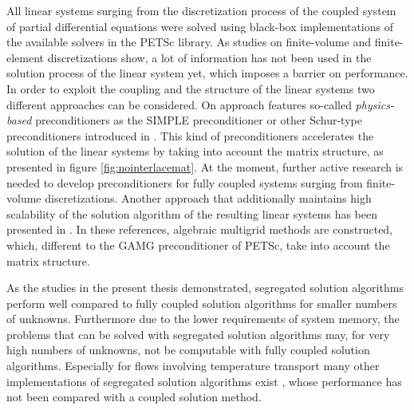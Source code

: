 All linear systems surging from the discretization process of the coupled system of partial differential equations were solved using black-box implementations of the available solvers in the PETSc library. As studies on finite-volume \cite{klaij13,darwish09,mangani14} and finite-element \cite{brown12,elman03,elman08,silvester01,turek02,mcinnes14} discretizations show, a lot of information has not been used in the solution process of the linear system yet, which imposes a barrier on performance. In order to exploit the coupling and the structure of the linear systems two different approaches can be considered. On approach features so-called \emph{physics-based} preconditioners as the SIMPLE preconditioner or other Schur-type preconditioners introduced in \cite{klaij13,elman08}. This kind of preconditioners accelerates the solution of the linear systems by taking into account the matrix structure, as presented in figure \ref{fig:nointerlacemat}. At the moment, further active research is needed to develop preconditioners for fully coupled systems surging from finite-volume discretizations. Another approach that additionally maintains high scalability of the solution algorithm of the resulting linear systems has been presented in \cite{darwish09,mangani14}. In these references, algebraic multigrid methods are constructed, which, different to the GAMG preconditioner of PETSc, take into account the matrix structure.

As the studies in the present thesis demonstrated, segregated solution algorithms perform well compared to fully coupled solution algorithms for smaller numbers of unknowns. Furthermore due to the lower requirements of system memory, the problems that can be solved with segregated solution algorithms may, for very high numbers of unknowns, not be computable with fully coupled solution algorithms. Especially for flows involving temperature transport many other implementations of segregated solution algorithms exist \cite{liu84,oliveira01}, whose performance has not been compared with a coupled solution method.

